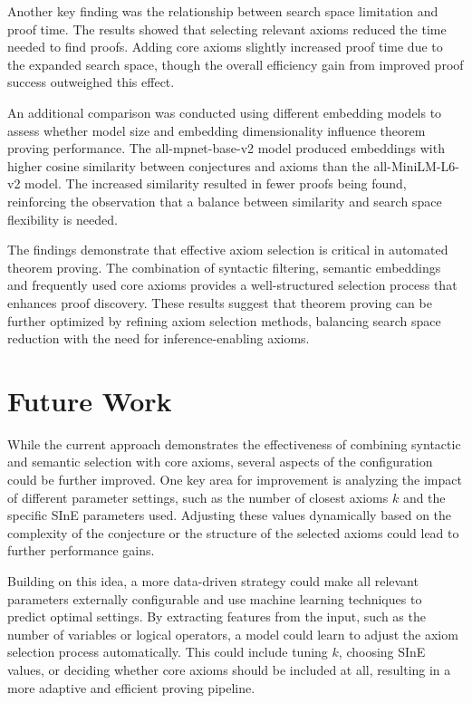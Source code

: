 \documentclass[english,version-2020-11]{uzl-thesis}
\begin{document}
Another key finding was the relationship between search space limitation and proof time. The results showed that selecting relevant axioms reduced the time needed to find proofs. Adding core axioms slightly increased proof time due to the expanded search space, though the overall efficiency gain from improved proof success outweighed this effect.

An additional comparison was conducted using different embedding models to assess whether model size and embedding dimensionality influence theorem proving performance. The all-mpnet-base-v2 model produced embeddings with higher cosine similarity between conjectures and axioms than the all-MiniLM-L6-v2 model. The increased similarity resulted in fewer proofs being found, reinforcing the observation that a balance between similarity and search space flexibility is needed. 

The findings demonstrate that effective axiom selection is critical in automated theorem proving. The combination of syntactic filtering, semantic embeddings and frequently used core axioms provides a well-structured selection process that enhances proof discovery. These results suggest that theorem proving can be further optimized by refining axiom selection methods, balancing search space reduction with the need for inference-enabling axioms.


\chapter{Future Work}
\label{chapter-futerwork}

While the current approach demonstrates the effectiveness of combining syntactic and semantic selection with core axioms, several aspects of the configuration could be further improved. One key area for improvement is analyzing the impact of different parameter settings, such as the number of closest axioms \( k \) and the specific SInE parameters used. Adjusting these values dynamically based on the complexity of the conjecture or the structure of the selected axioms could lead to further performance gains.

Building on this idea, a more data-driven strategy could make all relevant parameters externally configurable and use machine learning techniques to predict optimal settings. By extracting features from the input, such as the number of variables or logical operators, a model could learn to adjust the axiom selection process automatically. This could include tuning \( k \), choosing SInE values, or deciding whether core axioms should be included at all, resulting in a more adaptive and efficient proving pipeline.
\end{document}
